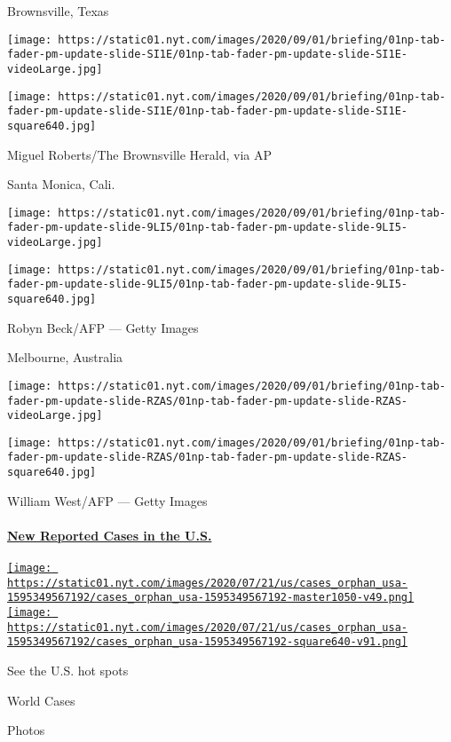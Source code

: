 Brownsville, Texas

\texttt{[image: https://static01.nyt.com/images/2020/09/01/briefing/01np-tab-fader-pm-update-slide-SI1E/01np-tab-fader-pm-update-slide-SI1E-videoLarge.jpg]}

\texttt{[image: https://static01.nyt.com/images/2020/09/01/briefing/01np-tab-fader-pm-update-slide-SI1E/01np-tab-fader-pm-update-slide-SI1E-square640.jpg]}

 Miguel Roberts/The Brownsville Herald, via AP

Santa Monica, Cali.

\texttt{[image: https://static01.nyt.com/images/2020/09/01/briefing/01np-tab-fader-pm-update-slide-9LI5/01np-tab-fader-pm-update-slide-9LI5-videoLarge.jpg]}

\texttt{[image: https://static01.nyt.com/images/2020/09/01/briefing/01np-tab-fader-pm-update-slide-9LI5/01np-tab-fader-pm-update-slide-9LI5-square640.jpg]}

 Robyn Beck/AFP --- Getty Images

Melbourne, Australia

\texttt{[image: https://static01.nyt.com/images/2020/09/01/briefing/01np-tab-fader-pm-update-slide-RZAS/01np-tab-fader-pm-update-slide-RZAS-videoLarge.jpg]}

\texttt{[image: https://static01.nyt.com/images/2020/09/01/briefing/01np-tab-fader-pm-update-slide-RZAS/01np-tab-fader-pm-update-slide-RZAS-square640.jpg]}

 William West/AFP --- Getty Images

\hypertarget{new-reported-cases-in-the-us}{%
\paragraph{\texorpdfstring{\href{https://www.nytimes.com/interactive/2020/us/coronavirus-us-cases.html}{New
Reported Cases in the
U.S.}}{New Reported Cases in the U.S.}}\label{new-reported-cases-in-the-us}}

\href{https://www.nytimes.com/interactive/2020/us/coronavirus-us-cases.html}{\texttt{[image: https://static01.nyt.com/images/2020/07/21/us/cases\_orphan\_usa-1595349567192/cases\_orphan\_usa-1595349567192-master1050-v49.png]}
\texttt{[image: https://static01.nyt.com/images/2020/07/21/us/cases\_orphan\_usa-1595349567192/cases\_orphan\_usa-1595349567192-square640-v91.png]}}

See the U.S. hot spots

World Cases

Photos

